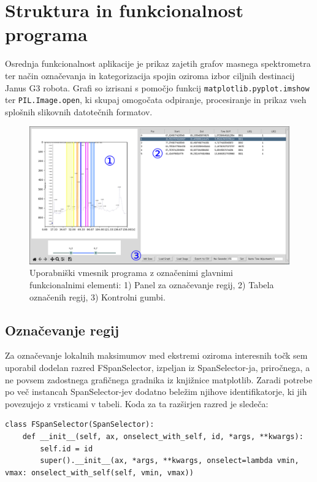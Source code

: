 \documentclass[a4paper,12pt]{article}
\begin{document}
\section{Struktura in funkcionalnost programa}

Osrednja funkcionalnost aplikacije je prikaz zajetih grafov masnega spektrometra ter način označevanja in kategorizacija spojin oziroma izbor ciljnih destinacij Janus G3 robota. Grafi so izrisani s pomočjo funkcij \texttt{matplotlib.pyplot.imshow} ter \texttt{PIL.Image.open}, ki skupaj omogočata odpiranje, procesiranje in prikaz vseh splošnih slikovnih datotečnih formatov.

\begin{figure}[H]
    \centering
    \includegraphics[width=\textwidth]{assets/full-1.png}
    \caption[Uporabniški vmesnik programa]{Uporabniški vmesnik programa  z označenimi glavnimi funkcionalnimi elementi: 1) Panel za označevanje regij, 2) Tabela označenih regij, 3) Kontrolni gumbi.}
    \label{fig:ui_overview}
\end{figure}

\subsection{Označevanje regij}

Za označevanje lokalnih maksimumov med ekstremi oziroma interesnih točk sem uporabil dodelan razred FSpanSelector, izpeljan iz SpanSelector-ja, priročnega, a ne povsem zadostnega grafičnega gradnika iz knjižnice matplotlib. Zaradi potrebe po več instancah SpanSelector-jev dodatno beležim njihove identifikatorje, ki jih povezujejo z vrsticami v tabeli. Koda za ta razširjen razred je sledeča:

\begin{lstlisting}[caption={Implementacija razširjenega SpanSelector razreda}, label={lst:fspanselector}]
class FSpanSelector(SpanSelector):
    def __init__(self, ax, onselect_with_self, id, *args, **kwargs):
        self.id = id
        super().__init__(ax, *args, **kwargs, onselect=lambda vmin, vmax: onselect_with_self(self, vmin, vmax))
\end{lstlisting}
\end{document}
